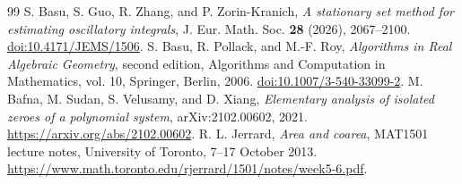 \documentclass[11pt]{amsart}
\theoremstyle{definition}
\theoremstyle{remark}
\numberwithin{equation}{section}
\begin{document}
\begin{thebibliography}{99}
 S. Basu, S. Guo, R. Zhang, and P. Zorin-Kranich, \emph{A stationary set method for estimating oscillatory integrals}, J. Eur. Math. Soc. \textbf{28} (2026), 2067--2100. \href{https://doi.org/10.4171/JEMS/1506}{doi:10.4171/JEMS/1506}.
 S. Basu, R. Pollack, and M.-F. Roy, \emph{Algorithms in Real Algebraic Geometry}, second edition, Algorithms and Computation in Mathematics, vol. 10, Springer, Berlin, 2006. \href{https://doi.org/10.1007/3-540-33099-2}{doi:10.1007/3-540-33099-2}.
 M. Bafna, M. Sudan, S. Velusamy, and D. Xiang, \emph{Elementary analysis of isolated zeroes of a polynomial system}, arXiv:2102.00602, 2021. \url{https://arxiv.org/abs/2102.00602}.
 R. L. Jerrard, \emph{Area and coarea}, MAT1501 lecture notes, University of Toronto, 7--17 October 2013. \url{https://www.math.toronto.edu/rjerrard/1501/notes/week5-6.pdf}.


\end{thebibliography}
\end{document}
